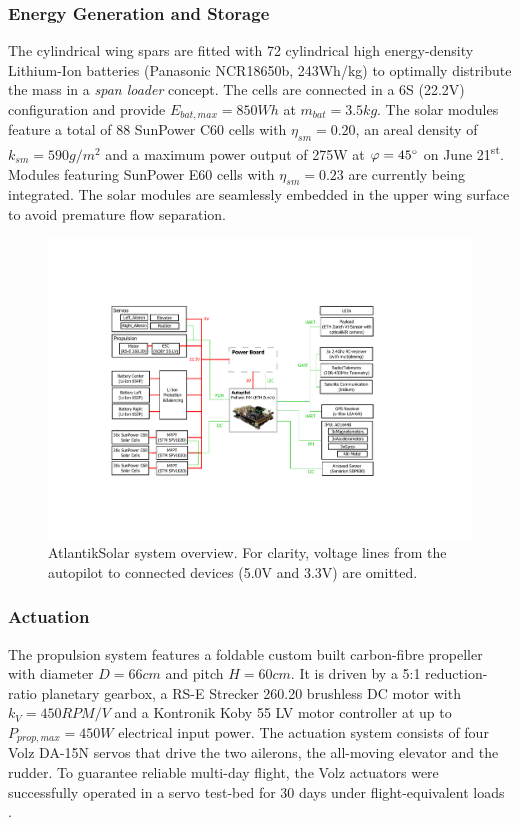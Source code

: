 \subsubsection{Energy Generation and Storage}
The cylindrical wing spars are fitted with 72 cylindrical high energy-density Lithium-Ion batteries (Panasonic NCR18650b, 243Wh/kg) to optimally distribute the mass in a \textit{span loader} concept. The cells are connected in a 6S (22.2V) configuration and provide $E_{bat,max}=850Wh$ at $m_{bat}=3.5kg$. The solar modules feature a total of 88 SunPower C60 cells with $\eta_{sm}=0.20$, an areal density of $k_{sm}=590g/m^2$ and a maximum power output of 275W at $\varphi=45\degree$ on June 21\textsuperscript{st}. Modules featuring SunPower E60 cells with $\eta_{sm}=0.23$ are currently being integrated\cite{Sunier_EPFLSolarModules}. The solar modules are seamlessly embedded in the upper wing surface to avoid premature flow separation.

\begin{figure}[tb]
    \centering
     \includegraphics[width=\linewidth]{images/8_AtlantikSolar_Avionics}
    \caption{AtlantikSolar system overview. For clarity, voltage lines from the autopilot to connected devices (5.0V and 3.3V) are omitted.}
    \label{fig:AtlantikSolar_SystemOverview}
\end{figure}

\subsubsection{Actuation}
The propulsion system features a foldable custom built carbon-fibre propeller with diameter $D=66cm$ and pitch $H=60cm$. It is driven by a 5:1 reduction-ratio planetary gearbox, a RS-E Strecker 260.20 brushless DC motor with $k_V=450RPM/V$ and a Kontronik Koby 55 LV motor controller at up to $P_{prop,max}=450W$ electrical input power. The actuation system consists of four Volz DA-15N servos that drive the two ailerons, the all-moving elevator and the rudder. To guarantee reliable multi-day flight, the Volz actuators were successfully operated in a servo test-bed for 30 days under flight-equivalent loads \cite{DellaCa_BT}.


